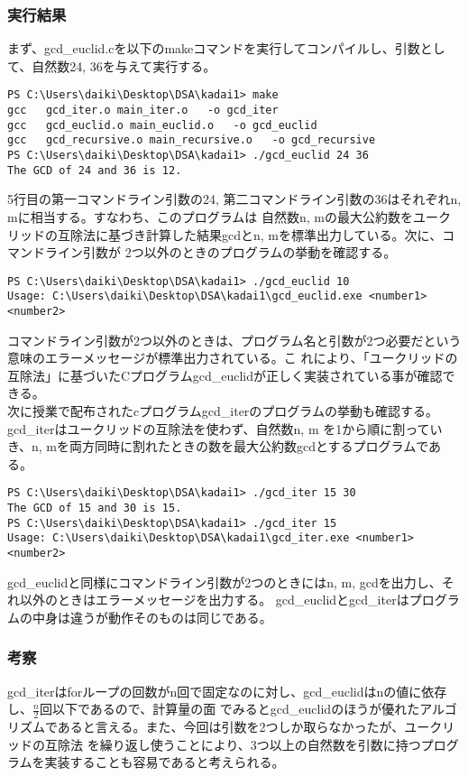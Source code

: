 \documentclass{ltjsarticle}
\begin{document}
\subsubsection{実行結果}\label{subsubsec:実行結果1}
まず、gcd\_euclid.cを以下のmakeコマンドを実行してコンパイルし、引数として、自然数24, 36を与えて実行する。
\begin{lstlisting}
PS C:\Users\daiki\Desktop\DSA\kadai1> make
gcc   gcd_iter.o main_iter.o   -o gcd_iter
gcc   gcd_euclid.o main_euclid.o   -o gcd_euclid
gcc   gcd_recursive.o main_recursive.o   -o gcd_recursive
PS C:\Users\daiki\Desktop\DSA\kadai1> ./gcd_euclid 24 36
The GCD of 24 and 36 is 12.
\end{lstlisting}
5行目の第一コマンドライン引数の24, 第二コマンドライン引数の36はそれぞれn, mに相当する。すなわち、このプログラムは
自然数n, mの最大公約数をユークリッドの互除法に基づき計算した結果gcdとn, mを標準出力している。次に、コマンドライン引数が
2つ以外のときのプログラムの挙動を確認する。
\begin{lstlisting}
PS C:\Users\daiki\Desktop\DSA\kadai1> ./gcd_euclid 10
Usage: C:\Users\daiki\Desktop\DSA\kadai1\gcd_euclid.exe <number1> <number2>
\end{lstlisting}
コマンドライン引数が2つ以外のときは、プログラム名と引数が2つ必要だという意味のエラーメッセージが標準出力されている。こ
れにより、「ユークリッドの互除法」に基づいたCプログラムgcd\_euclidが正しく実装されている事が確認できる。\\ \indent
次に授業で配布されたcプログラムgcd\_iterのプログラムの挙動も確認する。gcd\_iterはユークリッドの互除法を使わず、自然数n, m
を1から順に割っていき、n, mを両方同時に割れたときの数を最大公約数gcdとするプログラムである。
\begin{lstlisting}
PS C:\Users\daiki\Desktop\DSA\kadai1> ./gcd_iter 15 30
The GCD of 15 and 30 is 15.
PS C:\Users\daiki\Desktop\DSA\kadai1> ./gcd_iter 15
Usage: C:\Users\daiki\Desktop\DSA\kadai1\gcd_iter.exe <number1> <number2>
\end{lstlisting}
gcd\_euclidと同様にコマンドライン引数が2つのときにはn, m, gcdを出力し、それ以外のときはエラーメッセージを出力する。
gcd\_euclidとgcd\_iterはプログラムの中身は違うが動作そのものは同じである。
\subsubsection{考察}
gcd\_iterはforループの回数がn回で固定なのに対し、gcd\_euclidはnの値に依存し、$\frac{n}{2}$回以下であるので、計算量の面
でみるとgcd\_euclidのほうが優れたアルゴリズムであると言える。また、今回は引数を2つしか取らなかったが、ユークリッドの互除法
を繰り返し使うことにより、3つ以上の自然数を引数に持つプログラムを実装することも容易であると考えられる。
\end{document}
